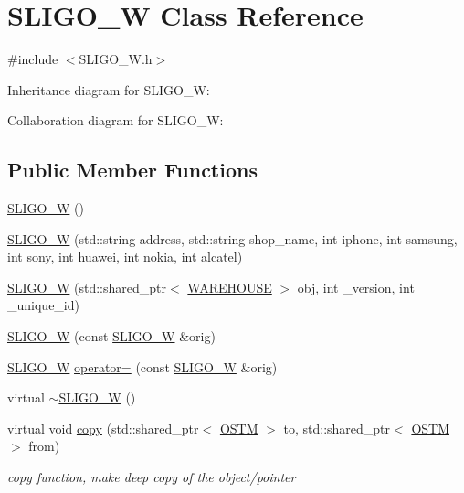 \hypertarget{class_s_l_i_g_o___w}{}\section{S\+L\+I\+G\+O\+\_\+W Class Reference}
\label{class_s_l_i_g_o___w}


{\ttfamily \#include $<$S\+L\+I\+G\+O\+\_\+\+W.\+h$>$}



Inheritance diagram for S\+L\+I\+G\+O\+\_\+W\+:


Collaboration diagram for S\+L\+I\+G\+O\+\_\+W\+:
\subsection*{Public Member Functions}
\begin{DoxyCompactItemize}
\item 
\hyperlink{class_s_l_i_g_o___w_a9b669809dc7cf8d9982181ac7997b0da}{S\+L\+I\+G\+O\+\_\+W} ()
\item 
\hyperlink{class_s_l_i_g_o___w_aced291d99970ff1c2f2146256f400788}{S\+L\+I\+G\+O\+\_\+W} (std\+::string address, std\+::string shop\+\_\+name, int iphone, int samsung, int sony, int huawei, int nokia, int alcatel)
\item 
\hyperlink{class_s_l_i_g_o___w_a5a969bbfbb08f8a5d29f766288f2f7e6}{S\+L\+I\+G\+O\+\_\+W} (std\+::shared\+\_\+ptr$<$ \hyperlink{class_w_a_r_e_h_o_u_s_e}{W\+A\+R\+E\+H\+O\+U\+SE} $>$ obj, int \+\_\+version, int \+\_\+unique\+\_\+id)
\item 
\hyperlink{class_s_l_i_g_o___w_abd92acb0451fe449fbdb7c3c2a6701b7}{S\+L\+I\+G\+O\+\_\+W} (const \hyperlink{class_s_l_i_g_o___w}{S\+L\+I\+G\+O\+\_\+W} \&orig)
\item 
\hyperlink{class_s_l_i_g_o___w}{S\+L\+I\+G\+O\+\_\+W} \hyperlink{class_s_l_i_g_o___w_a64051fdd5b3ebc47b0a74b42eb092c1b}{operator=} (const \hyperlink{class_s_l_i_g_o___w}{S\+L\+I\+G\+O\+\_\+W} \&orig)
\item 
virtual \hyperlink{class_s_l_i_g_o___w_aa6cc833af07309dee5eb2493cddf443c}{$\sim$\+S\+L\+I\+G\+O\+\_\+W} ()
\item 
virtual void \hyperlink{class_s_l_i_g_o___w_acd5ae7347e6ca94c52eb013e07a66116}{copy} (std\+::shared\+\_\+ptr$<$ \hyperlink{class_o_s_t_m}{O\+S\+TM} $>$ to, std\+::shared\+\_\+ptr$<$ \hyperlink{class_o_s_t_m}{O\+S\+TM} $>$ from)
\begin{DoxyCompactList}\small\item\em copy function, make deep copy of the object/pointer \end{DoxyCompactList}\item 

\end{DoxyCompactItemize}

